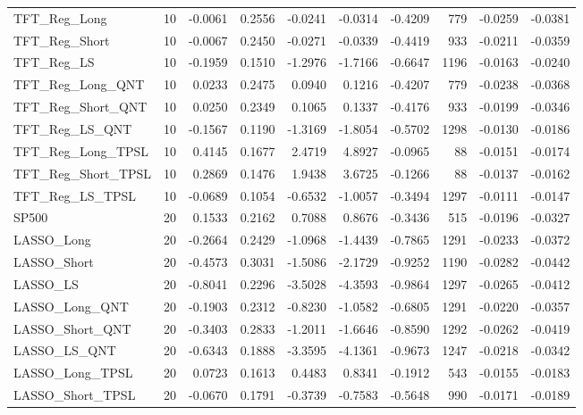 \begin{tabular}{llrrrrrrrr}
\cline{1-10}
TFT\_Reg\_Long & 10 & -0.0061 & 0.2556 & -0.0241 & -0.0314 & -0.4209 & 779 & -0.0259 & -0.0381 \\
\cline{1-10}
TFT\_Reg\_Short & 10 & -0.0067 & 0.2450 & -0.0271 & -0.0339 & -0.4419 & 933 & -0.0211 & -0.0359 \\
\cline{1-10}
TFT\_Reg\_LS & 10 & -0.1959 & 0.1510 & -1.2976 & -1.7166 & -0.6647 & 1196 & -0.0163 & -0.0240 \\
\cline{1-10}
TFT\_Reg\_Long\_QNT & 10 & 0.0233 & 0.2475 & 0.0940 & 0.1216 & -0.4207 & 779 & -0.0238 & -0.0368 \\
\cline{1-10}
TFT\_Reg\_Short\_QNT & 10 & 0.0250 & 0.2349 & 0.1065 & 0.1337 & -0.4176 & 933 & -0.0199 & -0.0346 \\
\cline{1-10}
TFT\_Reg\_LS\_QNT & 10 & -0.1567 & 0.1190 & -1.3169 & -1.8054 & -0.5702 & 1298 & -0.0130 & -0.0186 \\
\cline{1-10}
TFT\_Reg\_Long\_TPSL & 10 & 0.4145 & 0.1677 & 2.4719 & 4.8927 & -0.0965 & 88 & -0.0151 & -0.0174 \\
\cline{1-10}
TFT\_Reg\_Short\_TPSL & 10 & 0.2869 & 0.1476 & 1.9438 & 3.6725 & -0.1266 & 88 & -0.0137 & -0.0162 \\
\cline{1-10}
TFT\_Reg\_LS\_TPSL & 10 & -0.0689 & 0.1054 & -0.6532 & -1.0057 & -0.3494 & 1297 & -0.0111 & -0.0147 \\
\cline{1-10}
SP500 & 20 & 0.1533 & 0.2162 & 0.7088 & 0.8676 & -0.3436 & 515 & -0.0196 & -0.0327 \\
\cline{1-10}
LASSO\_Long & 20 & -0.2664 & 0.2429 & -1.0968 & -1.4439 & -0.7865 & 1291 & -0.0233 & -0.0372 \\
\cline{1-10}
LASSO\_Short & 20 & -0.4573 & 0.3031 & -1.5086 & -2.1729 & -0.9252 & 1190 & -0.0282 & -0.0442 \\
\cline{1-10}
LASSO\_LS & 20 & -0.8041 & 0.2296 & -3.5028 & -4.3593 & -0.9864 & 1297 & -0.0265 & -0.0412 \\
\cline{1-10}
LASSO\_Long\_QNT & 20 & -0.1903 & 0.2312 & -0.8230 & -1.0582 & -0.6805 & 1291 & -0.0220 & -0.0357 \\
\cline{1-10}
LASSO\_Short\_QNT & 20 & -0.3403 & 0.2833 & -1.2011 & -1.6646 & -0.8590 & 1292 & -0.0262 & -0.0419 \\
\cline{1-10}
LASSO\_LS\_QNT & 20 & -0.6343 & 0.1888 & -3.3595 & -4.1361 & -0.9673 & 1247 & -0.0218 & -0.0342 \\
\cline{1-10}
LASSO\_Long\_TPSL & 20 & 0.0723 & 0.1613 & 0.4483 & 0.8341 & -0.1912 & 543 & -0.0155 & -0.0183 \\
\cline{1-10}
LASSO\_Short\_TPSL & 20 & -0.0670 & 0.1791 & -0.3739 & -0.7583 & -0.5648 & 990 & -0.0171 & -0.0189 \\

\end{tabular}
